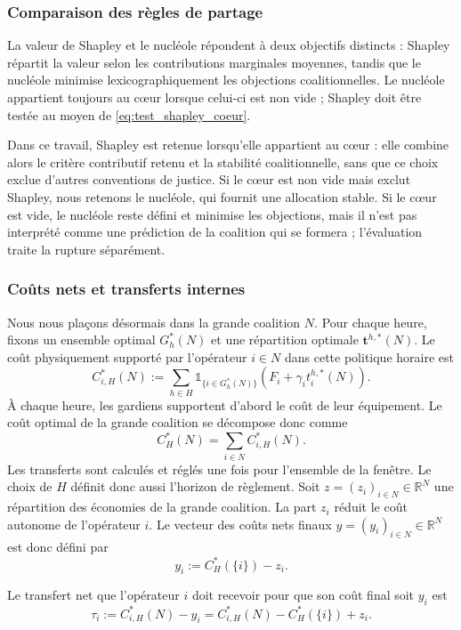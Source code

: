 \subsubsection{Comparaison des règles de partage}
\label{subsubsec:comparaison_partages}

La valeur de Shapley et le nucléole répondent à deux objectifs distincts :
Shapley répartit la valeur selon les contributions marginales moyennes, tandis
que le nucléole minimise lexicographiquement les objections coalitionnelles.
Le nucléole appartient toujours au cœur lorsque celui-ci est non vide ;
Shapley doit être testée au moyen de \eqref{eq:test_shapley_coeur}.

Dans ce travail, Shapley est retenue lorsqu'elle appartient au cœur : elle
combine alors le critère contributif retenu et la stabilité coalitionnelle,
sans que ce choix exclue d'autres conventions de justice. Si le cœur
est non vide mais exclut Shapley, nous retenons le nucléole, qui fournit une
allocation stable. Si le cœur est vide, le nucléole reste défini et minimise
les objections, mais il n'est pas interprété comme une prédiction de la
coalition qui se formera ; l'évaluation traite la rupture séparément.

\subsubsection{Coûts nets et transferts internes}

Nous nous plaçons désormais dans la grande coalition $N$. Pour chaque heure,
fixons un ensemble optimal $G_h^*(N)$ et une répartition optimale
\(\mathbf t^{h,*}(N)\). Le coût physiquement supporté par l'opérateur
$i\in N$ dans cette politique horaire est
\[
C_{i,H}^*(N)
:=
\sum_{h\in H}
\mathds{1}_{\{i\in G_h^*(N)\}}
\left(F_i+\gamma_i t_i^{h,*}(N)\right).
\]
À chaque heure, les gardiens supportent d'abord le coût de leur équipement.
Le coût optimal de la grande coalition se décompose donc comme
\[
C_H^*(N)=\sum_{i\in N}C_{i,H}^*(N).
\]
Les transferts sont calculés et réglés une fois pour l'ensemble de la fenêtre.
Le choix de \(H\) définit donc aussi l'horizon de règlement.
Soit $z=(z_i)_{i\in N}\in\mathbb R^N$ une répartition des économies de
la grande coalition. La part $z_i$ réduit le coût autonome de l'opérateur
$i$. Le vecteur des coûts nets finaux $y=(y_i)_{i\in N}\in\mathbb R^N$
est donc défini par
\[
    y_i:=C_H^*(\{i\})-z_i.
\]

Le transfert net que l'opérateur $i$ doit recevoir pour que son coût final
soit $y_i$ est
\[
\tau_i
:=
C_{i,H}^*(N)-y_i
=
C_{i,H}^*(N)-C_H^*(\{i\})+z_i.
\]

